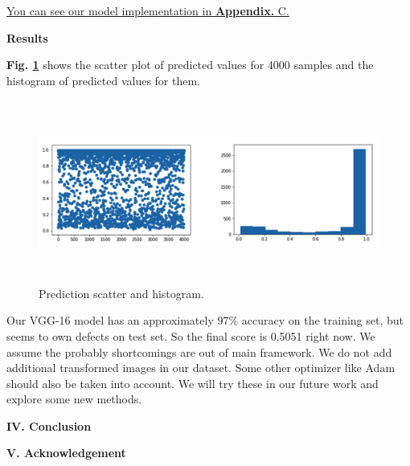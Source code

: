 \documentclass[a4paper]{article}
\begin{document}
\large{\underline{You can see our model implementation in \textbf{Appendix.} C.}}
\vspace{2mm}
\begin{center}
\large\textbf{Results} \\
\end{center}

\large{

\textbf{Fig. \ref{vggresults}} shows the scatter plot of predicted values for 4000 samples and the histogram of predicted values for them.

}

\begin{figure}[H]
\centering
\includegraphics[width=15cm,height=6cm]{vggresults.png}
\caption{Prediction scatter and histogram.}
\label{vggresults}
\end{figure}

\large{
Our \textsf{VGG-16} model has an approximately 97\% accuracy on the training set, but seems to own defects on test set. So the final score is 0.5051 right now. We assume the probably shortcomings are out of main framework. We do not add additional transformed images in our dataset. Some other optimizer like Adam should also be taken into account. We will try these in our future work and explore some new methods.

}

\vspace{15mm}
\begin{center}
\LARGE\textbf{IV. Conclusion} \\
\end{center}
\vspace{2mm}


\vspace{1.5cm}
\begin{center}
\LARGE\textbf{V. Acknowledgement} \\
\end{center}
\vspace{.5mm}
\end{document}
